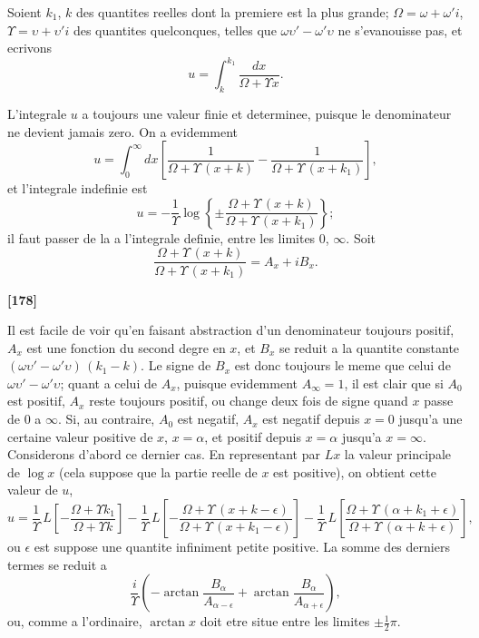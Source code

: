 \documentclass[11pt,a4paper]{book}
\begin{document}
Soient $k_1$, $k$ des quantites reelles dont la premiere est la plus grande; $\Omega = \omega + \omega'i$,
$\Upsilon = \upsilon + \upsilon'i$ des quantites quelconques, telles que $\omega\upsilon' - \omega'\upsilon$ ne s'evanouisse pas, et ecrivons
\begin{equation}
u = \int_k^{k_1} \frac{dx}{\Omega + \Upsilon x}. \tag{55}
\end{equation}

L'integrale $u$ a toujours une valeur finie et determinee, puisque le denominateur ne
devient jamais zero. On a evidemment
\begin{equation}
u = \int_0^{\infty} dx \left[\frac{1}{\Omega + \Upsilon\, (x+k)} - \frac{1}{\Omega + \Upsilon\, (x+k_1)}\right], \tag{56}
\end{equation}
et l'integrale indefinie est
\begin{equation}
u = -\frac{1}{\Upsilon}\log \left\{\pm \frac{\Omega + \Upsilon\, (x+k)}{\Omega + \Upsilon\, (x+k_1)}\right\}; \tag{57}
\end{equation}
il faut passer de la a l'integrale definie, entre les limites $0$, $\infty$. Soit
\begin{equation}
\frac{\Omega + \Upsilon\, (x+k)}{\Omega + \Upsilon\, (x+k_1)} = A_x + iB_x. \tag{58}
\end{equation}

\textbf{[178]}

Il est facile de voir qu'en faisant abstraction d'un denominateur toujours positif, $A_x$
est une fonction du second degre en $x$, et $B_x$ se reduit a la quantite constante
$(\omega\upsilon' - \omega'\upsilon)\, (k_1 - k)$. Le signe de $B_x$ est donc toujours le meme que celui de $\omega\upsilon' - \omega'\upsilon$;
quant a celui de $A_x$, puisque evidemment $A_{\infty} = 1$, il est clair que si $A_0$ est positif,
$A_x$ reste toujours positif, ou change deux fois de signe quand $x$ passe de $0$ a $\infty$. Si,
au contraire, $A_0$ est negatif, $A_x$ est negatif depuis $x = 0$ jusqu'a une certaine valeur
positive de $x$, $x = \alpha$, et positif depuis $x = \alpha$ jusqu'a $x = \infty$. Considerons d'abord ce dernier
cas. En representant par $Lx$ la valeur principale de $\log x$ (cela suppose que la partie
reelle de $x$ est positive), on obtient cette valeur de $u$,
\[u = \frac{1}{\Upsilon}\, L\left[-\frac{\Omega + \Upsilon k_1}{\Omega + \Upsilon k}\right]
- \frac{1}{\Upsilon}\, L\left[-\frac{\Omega + \Upsilon\, (x+k - \epsilon)}{\Omega + \Upsilon\, (x+k_1 - \epsilon)}\right]
- \frac{1}{\Upsilon}\, L\left[\frac{\Omega + \Upsilon\, (\alpha+k_1 + \epsilon)}{\Omega + \Upsilon\, (\alpha+k + \epsilon)}\right],\]
ou $\epsilon$ est suppose une quantite infiniment petite positive. La somme des derniers termes
se reduit a
\begin{equation}
\frac{i}{\Upsilon}\left(-\arctan \frac{B_{\alpha}}{A_{\alpha-\epsilon}} + \arctan \frac{B_{\alpha}}{A_{\alpha+\epsilon}}\right), \tag{59}
\end{equation}
ou, comme a l'ordinaire, $\arctan x$ doit etre situe entre les limites $\pm \frac{1}{2}\pi$.
\end{document}
